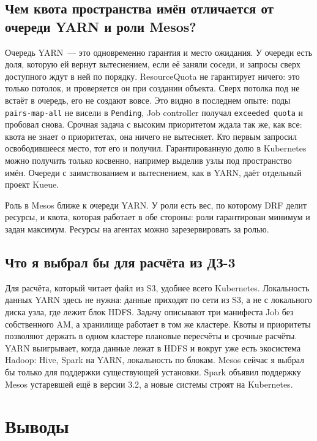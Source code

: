 \documentclass[11pt,a4paper]{article}
\begin{document}
\subsection{Чем квота пространства имён отличается от очереди YARN и роли Mesos?}

Очередь YARN~--- это одновременно гарантия и место ожидания. У очереди есть доля, которую ей вернут вытеснением, если её заняли соседи, и запросы сверх доступного ждут в ней по порядку. ResourceQuota не гарантирует ничего: это только потолок, и проверяется он при создании объекта. Сверх потолка под не встаёт в очередь, его не создают вовсе. Это видно в последнем опыте: поды \texttt{pairs-map-all} не висели в \texttt{Pending}, Job controller получал \texttt{exceeded quota} и пробовал снова. Срочная задача с высоким приоритетом ждала так же, как все: квота не знает о приоритетах, она ничего не вытесняет. Кто первым запросил освободившееся место, тот его и получил. Гарантированную долю в Kubernetes можно получить только косвенно, например выделив узлы под пространство имён. Очереди с заимствованием и вытеснением, как в YARN, даёт отдельный проект Kueue.

Роль в Mesos ближе к очереди YARN. У роли есть вес, по которому DRF делит ресурсы, и квота, которая работает в обе стороны: роли гарантирован минимум и задан максимум. Ресурсы на агентах можно зарезервировать за ролью.

\subsection{Что я выбрал бы для расчёта из ДЗ-3}

Для расчёта, который читает файл из S3, удобнее всего Kubernetes. Локальность данных YARN здесь не нужна: данные приходят по сети из S3, а не с локального диска узла, где лежит блок HDFS. Задачу описывают три манифеста Job без собственного AM, а хранилище работает в том же кластере. Квоты и приоритеты позволяют держать в одном кластере плановые пересчёты и срочные расчёты. YARN выигрывает, когда данные лежат в HDFS и вокруг уже есть экосистема Hadoop: Hive, Spark на YARN, локальность по блокам. Mesos сейчас я выбрал бы только для поддержки существующей установки. Spark объявил поддержку Mesos устаревшей ещё в версии 3.2, а новые системы строят на Kubernetes.

\section{Выводы}
\end{document}
